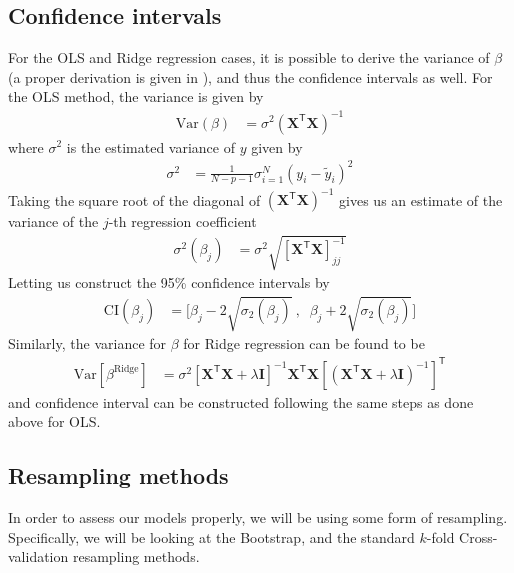 \documentclass[a4paper]{article}
\newcommand{\XX}{\mathbf{X}}
\newcommand{\II}{\textbf{I}}
\newcommand{\T}{\mathsf{T}}
\begin{document}
\subsection{Confidence intervals}
For the OLS and Ridge regression cases, it is possible to derive the variance of $\beta$ (a proper derivation is given in \cite{vanwieringen2020lecture}), and thus the confidence intervals as well. For the OLS method, the variance is given by
\begin{align*}
	\text{Var}(\beta) &= \sigma^2(\XX^\T\XX)^{-1}
\end{align*}
where $\sigma^2$ is the estimated variance of $y$ given by %
\begin{align*}
	\sigma^2 &= \frac{1}{N-p-1}\sigma_{i=1}^N(y_i-\tilde y_i)^2
\end{align*}
Taking the square root of the diagonal of $(\XX^\T\XX)^{-1}$ gives us an estimate of the variance of the $j$-th regression coefficient
\begin{align*}
	\sigma^2(\beta_j) &= \sigma^2\sqrt{[\XX^\T\XX]^{-1}_{jj}}
\end{align*}
Letting us construct the 95\% confidence intervals by
\begin{align*}
	\text{CI}(\beta_j) &= \bigg[\beta_j - 2\sqrt{\sigma_2(\beta_j)}\:,\;\; \beta_j + 2\sqrt{\sigma_2(\beta_j)}\bigg]
\end{align*}
Similarly, the variance for $\beta$ for Ridge regression can be found to be
\begin{align*}
\text{Var}[\beta^{\text{Ridge}}] &= \sigma^2[\XX^\T\XX + \lambda\II]^{-1}
\XX^\T \XX[(\XX^\T \XX + \lambda \II)^{-1}]^\T
\end{align*}
and confidence interval can be constructed following the same steps as done above for OLS.%

\subsection{Resampling methods}
In order to assess our models properly, we will be using some form of resampling. Specifically, we will be looking at the Bootstrap, and the standard $k$-fold Cross-validation resampling methods.
\end{document}
